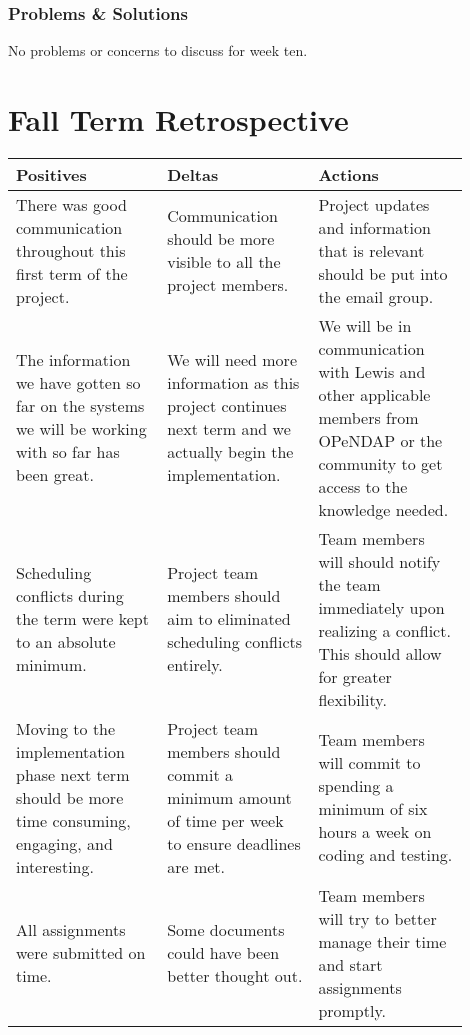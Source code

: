 \documentclass[onecolumn, draftclsnofoot,10pt, compsoc]{IEEEtran}
\begin{document}
\subsubsection{Problems \& Solutions}
No problems or concerns to discuss for week ten.

\section{Fall Term Retrospective}

\begin{center}
\begin{tabular}{ |p{0.3\linewidth}|p{0.3\linewidth}|p{0.3\linewidth}| } 
	\hline
	Positives & Deltas & Actions \\ 
	\hline
  	There was good communication throughout this first term of the project.
   	& 
    Communication should be more visible to all the project members.
	&
    Project updates and information that is relevant should be put into the email group.
    \\ 
    \hline
    The information we have gotten so far on the systems we will be working with so far has been great.
   	& 
    We will need more information as this project continues next term and we actually begin the implementation.
	&
    We will be in communication with Lewis and other applicable members from OPeNDAP or the community to get access to the knowledge needed.
    \\ 
    \hline
    Scheduling conflicts during the term were kept to an absolute minimum.
    &
    Project team members should aim to eliminated scheduling conflicts entirely.
    &
    Team members will should notify the team immediately upon realizing a conflict. This should allow for greater flexibility.
    \\
	\hline
     Moving to the implementation phase next term should be more time consuming, engaging, and interesting.
    &
    Project team members should commit a minimum amount of time per week to ensure deadlines are met.
    &
    Team members will commit to spending a minimum of six hours a week on coding and testing.
    \\
    \hline
    All assignments were submitted on time.
    &
    Some documents could have been better thought out.
    &
    Team members will try to better manage their time and start assignments promptly.
    \\
    \hline
\end{tabular}
\end{center}
\end{document}
